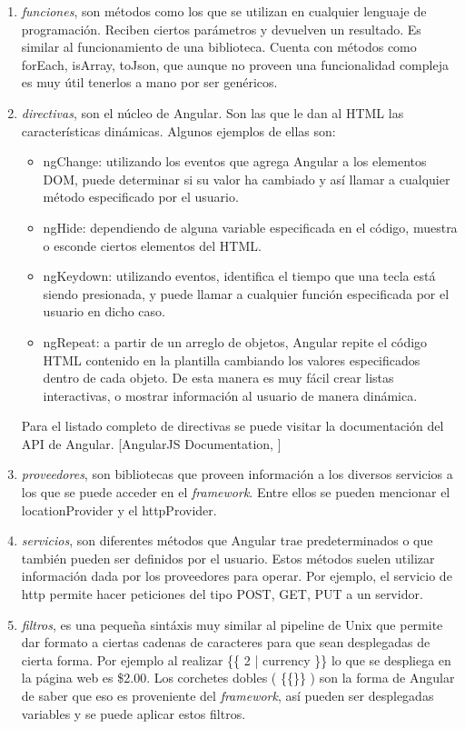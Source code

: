 \begin{enumerate}
	\item \emph{funciones}, son métodos como los que se utilizan en cualquier lenguaje de programación. Reciben ciertos parámetros y devuelven un resultado. Es similar al funcionamiento de una biblioteca. Cuenta con métodos como forEach, isArray, toJson, que aunque no proveen una funcionalidad compleja es muy útil tenerlos a mano por ser genéricos.
	\item \emph{directivas}, son el núcleo de Angular. Son las que le dan al HTML las características dinámicas. Algunos ejemplos de ellas son:
	\begin{itemize}
		
		\item ngChange: utilizando los eventos que agrega Angular a los elementos DOM, puede determinar si su valor ha cambiado y así llamar a cualquier método especificado por el usuario. 
		\item ngHide: dependiendo de alguna variable especificada en el código, muestra o esconde ciertos elementos del HTML.
		\item ngKeydown: utilizando eventos, identifica el tiempo que una tecla está siendo presionada, y puede llamar a cualquier función especificada por el usuario en dicho caso.
		\item ngRepeat: a partir de un arreglo de objetos, Angular repite el código HTML contenido en la plantilla cambiando los valores especificados dentro de cada objeto. De esta manera es muy fácil crear listas interactivas, o mostrar información al usuario de manera dinámica.

	\end{itemize}
	
	Para el listado completo de directivas se puede visitar la documentación del API de Angular. [AngularJS Documentation, \cite{angularjsdocs}]
	
	\item \emph{proveedores}, son bibliotecas que proveen información a los diversos servicios a los que se puede acceder en el \textit{framework}. Entre ellos se pueden mencionar el locationProvider y el httpProvider.
	
	\item \emph{servicios}, son diferentes métodos que Angular trae predeterminados o que también pueden ser definidos por el usuario. Estos métodos suelen utilizar información dada por los proveedores para operar. Por ejemplo, el servicio de http permite hacer peticiones del tipo POST, GET, PUT a un servidor. 
	 
	\item \emph{filtros}, es una pequeña sintáxis muy similar al pipeline de Unix que permite dar formato a ciertas cadenas de caracteres para que sean desplegadas de cierta forma. Por ejemplo al realizar \{\{ 2 | currency \}\} lo que se despliega en la página web es \$2.00. Los corchetes dobles ( \{\{\}\} ) son la forma de Angular de saber que eso es proveniente del \textit{framework}, así pueden ser desplegadas variables y se puede aplicar estos filtros.
\end{enumerate}

